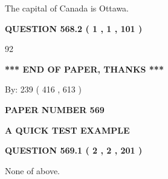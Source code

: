 \documentclass[12pt]{article}
\begin{document}
 
The capital of Canada is Ottawa.
 
 
 
 
  
\vspace{0.2in}
  
{\textbf{\Large{QUESTION
568.2 
 ( 1 , 1 , 101 )
}}}
  
  
 
 
\noindent{}

92
 
 
   
   
 \vspace{0.2in}
 
   
   
   
   
\vspace{1.0in} 
{\textbf{\large{ *** END OF PAPER, THANKS *** }}} 
   
   
\hspace{1.0in} By: 
 239 ( 416 ,  613 )
   
   
   
   
\newpage 
\setcounter{page}{ 
   569001 } 
   
   
   
   
 {\textbf{ \Large{ PAPER NUMBER  569  }}}
   
   
\vspace{0.2in}
   
   
   
   
   
   
 \vspace{0.2in}
{\LARGE {\textbf{ A QUICK TEST EXAMPLE}}}
   
   
  
\vspace{0.2in}
  
{\textbf{\Large{QUESTION
569.1 
 ( 2 , 2 , 201 )
}}}
  
  
 
 
\noindent{}
 
 
 None of above.
 
 
 
 
  
\vspace{0.2in}
  
\end{document}
